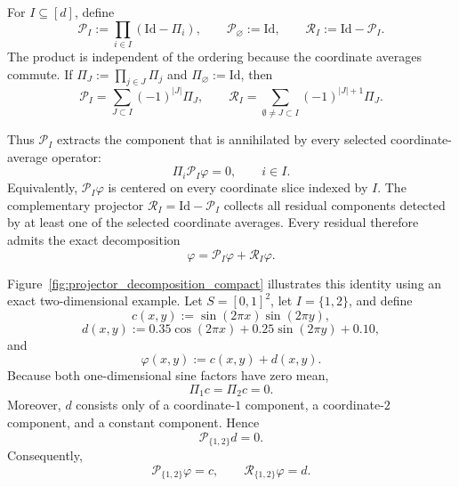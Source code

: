 \documentclass[11pt,letterpaper]{article}
\theoremstyle{definition}
\theoremstyle{remark}
\newcommand{\Id}{\mathrm{Id}}
\begin{document}
For $I\subseteq[d]$, define
\begin{equation}
\label{eq:projectors_section}
\mathcal P_I:=\prod_{i\in I}(\Id-\Pi_i),
\qquad
\mathcal P_\varnothing:=\Id,
\qquad
\mathcal R_I:=\Id-\mathcal P_I.
\end{equation}
The product is independent of the ordering because the coordinate averages
commute. If $\Pi_J:=\prod_{j\in J}\Pi_j$ and $\Pi_\varnothing:=\Id$, then
$$
\mathcal P_I
=
\sum_{J\subset I}(-1)^{|J|}\Pi_J,
\qquad
\mathcal R_I
=
\sum_{\emptyset\neq J\subset I}(-1)^{|J|+1}\Pi_J .
$$

Thus $\mathcal P_I$ extracts the component that is annihilated by every
selected coordinate-average operator:
\[
\Pi_i\mathcal P_I\varphi=0,
\qquad i\in I.
\]
Equivalently, $\mathcal P_I\varphi$ is centered on every coordinate slice
indexed by $I$. The complementary projector
$\mathcal R_I=\Id-\mathcal P_I$ collects all residual components detected by
at least one of the selected coordinate averages. Every residual therefore
admits the exact decomposition
\[
\varphi
=
\mathcal P_I\varphi+\mathcal R_I\varphi.
\]

Figure~\ref{fig:projector_decomposition_compact} illustrates this identity
using an exact two-dimensional example. Let $S=[0,1]^2$, let
$I=\{1,2\}$, and define
\[
c(x,y)
:=
\sin(2\pi x)\sin(2\pi y),
\]
\[
d(x,y)
:=
0.35\cos(2\pi x)
+
0.25\sin(2\pi y)
+
0.10,
\]
and
\[
\varphi(x,y):=c(x,y)+d(x,y).
\]
Because both one-dimensional sine factors have zero mean,
\[
\Pi_1c=\Pi_2c=0.
\]
Moreover, $d$ consists only of a coordinate-$1$ component, a coordinate-$2$
component, and a constant component. Hence
\[
\mathcal P_{\{1,2\}}d=0.
\]
Consequently,
\[
\mathcal P_{\{1,2\}}\varphi=c,
\qquad
\mathcal R_{\{1,2\}}\varphi=d.
\]
\end{document}
